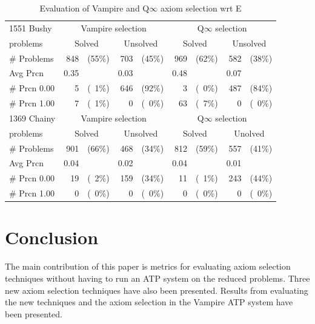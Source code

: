 \documentclass[]{ceurart}
\begin{document}
\begin{table}
\centering
\begin{tabular}{|l|rr|rr|rr|rr|}
\hline
1551 Bushy      & \multicolumn{4}{|c|}{Vampire selection} & \multicolumn{4}{|c|}{Q$\infty$ selection} \\
problems        & \multicolumn{2}{|c|}{Solved} & \multicolumn{2}{|c|}{Unsolved} & \multicolumn{2}{|c|}{Solved} & \multicolumn{2}{|c|}{Unsolved} \\
\hline
\# Problems     &  848 & (55\%) &  703 & (45\%) &  969 & (62\%) &  582 & (38\%) \\
Avg Prcn        & 0.35 &        & 0.03 &        & 0.48 &        & 0.07 &        \\
\# Prcn 0.00    &    5 & (~1\%) &  646 & (92\%) &    3 & (~0\%) &  487 & (84\%) \\
\# Prcn 1.00    &    7 & (~1\%) &    0 & (~0\%) &   63 & (~7\%) &    0 & (~0\%) \\
\hline
\hline
1369 Chainy     & \multicolumn{4}{|c|}{Vampire selection} & \multicolumn{4}{|c|}{Q$\infty$ selection} \\
problems        & \multicolumn{2}{|c|}{Solved} & \multicolumn{2}{|c|}{Unsolved} & \multicolumn{2}{|c|}{Solved} & \multicolumn{2}{|c|}{Unolved} \\
\hline
\# Problems     &  901 & (66\%) &  468 & (34\%) &  812 & (59\%) &  557 & (41\%) \\
Avg Prcn        & 0.04 &        & 0.02 &        & 0.04 &        & 0.01 &        \\
\# Prcn 0.00    &   19 & (~2\%) &  159 & (34\%) &   11 & (~1\%) &  243 & (44\%) \\
\# Prcn 1.00    &    0 & (~0\%) &    0 & (~0\%) &    0 & (~0\%) &    0 & (~0\%) \\
\hline
\end{tabular}
\caption{Evaluation of Vampire and Q$\infty$ axiom selection wrt E}
\label{EvaluationOfMetrics}
\end{table}

\section{Conclusion}
\label{Conclusion}

The main contribution of this paper is metrics for evaluating axiom selection 
techniques without having to run an ATP system on the reduced problems.
Three new axiom selection techniques have also been presented.
Results from evaluating the new techniques and the axiom selection in the 
Vampire ATP system have been presented.
\end{document}
